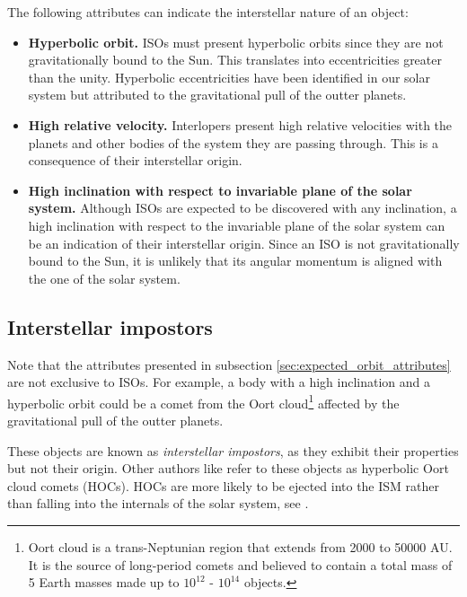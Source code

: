 The following attributes can indicate the interstellar nature of an object:

\begin{itemize}
    \item \textbf{Hyperbolic orbit.} ISOs must present hyperbolic orbits since
        they are not gravitationally bound to the Sun. This translates into
        eccentricities greater than the unity. Hyperbolic eccentricities have
        been identified in our solar system but attributed to the gravitational
        pull of the outter planets.
    \item \textbf{High relative velocity.} Interlopers present high relative
        velocities with the planets and other bodies of the system they are
        passing through. This is a consequence of their interstellar origin.
    \item \textbf{High inclination with respect to invariable plane of the solar
        system.} Although ISOs are expected to be discovered with any
        inclination, a high inclination with respect to the invariable plane of
        the solar system can be an indication of their interstellar origin.
        Since an ISO is not gravitationally bound to the Sun, it is unlikely
        that its angular momentum is aligned with the one of the solar system.
\end{itemize}

\subsection{Interstellar impostors}

Note that the attributes presented in subsection
\ref{sec:expected_orbit_attributes} are not exclusive to ISOs. For example, a
body with a high inclination and a hyperbolic orbit could be a comet from the
Oort cloud\footnote{ Oort cloud is a trans-Neptunian region that extends from
2000 to 50000 AU. It is the source of long-period comets and believed to contain
a total mass of 5 Earth masses made up to $10^{12}$ - $10^{14}$ objects. }
affected by the gravitational pull of the outter planets.

These objects are known as \textit{interstellar impostors}, as they exhibit
their properties but not their origin. Other authors like \cite{higuchi2020}
refer to these objects as hyperbolic Oort cloud comets (HOCs). HOCs are more
likely to be ejected into the ISM rather than falling into the internals of the
solar system, see \cite{francis2005}.
